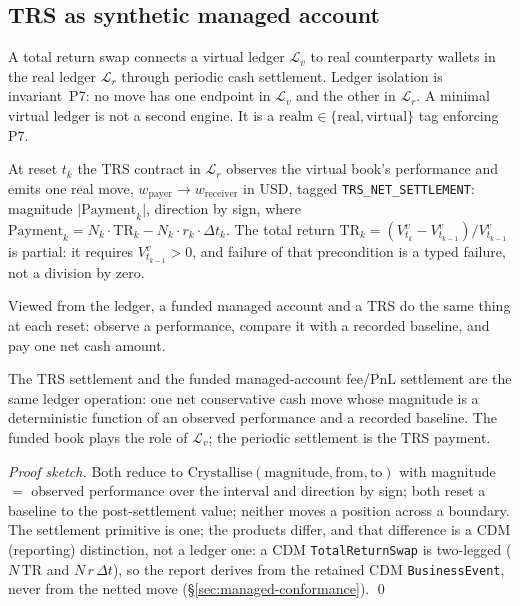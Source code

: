 \subsection{TRS as synthetic managed account}
\label{sec:managed-trs}

A total return swap connects a virtual ledger $\mathcal{L}_v$ to real counterparty wallets
in the real ledger $\mathcal{L}_r$ through periodic cash settlement. Ledger isolation is
invariant~P7: no move has one endpoint in $\mathcal{L}_v$ and the other in $\mathcal{L}_r$.
A minimal virtual ledger is not a second engine. It is a
$\mathrm{realm}\in\{\text{real},\text{virtual}\}$ tag enforcing P7.

At reset $t_k$ the TRS contract in $\mathcal{L}_r$ observes the virtual book's performance
and emits one real move, $w_{\text{payer}}\to w_{\text{receiver}}$ in USD, tagged
\texttt{TRS\_NET\_SETTLEMENT}: magnitude $\big|\mathrm{Payment}_k\big|$, direction by sign,
where $\mathrm{Payment}_k=N_k\cdot\mathrm{TR}_k-N_k\cdot r_k\cdot\Delta t_k$. The
total return $\mathrm{TR}_k=(V^v_{t_k}-V^v_{t_{k-1}})/V^v_{t_{k-1}}$ is partial: it requires
$V^v_{t_{k-1}}>0$, and failure of that precondition is a typed failure, not a division by
zero.

Viewed from the ledger, a funded managed account and a TRS do the same thing at each reset:
observe a performance, compare it with a recorded baseline, and pay one net cash amount.

\begin{theorem}
\label{thm:trs-equiv}
The TRS settlement and the funded managed-account fee/PnL settlement are the same ledger
operation: one net conservative cash move whose magnitude is a deterministic function of an
observed performance and a recorded baseline. The funded book plays the role of $\mathcal{L}_v$;
the periodic settlement is the TRS payment.
\end{theorem}
\noindent\textit{Proof sketch.} Both reduce to
$\mathrm{Crystallise}(\text{magnitude},\text{from},\text{to})$ with magnitude $=$ observed
performance over the interval and direction by sign; both reset a baseline to the post-settlement
value; neither moves a position across a boundary. The settlement primitive is one; the products
differ, and that difference is a CDM (reporting) distinction, not a ledger one: a CDM
\texttt{TotalReturnSwap} is two-legged ($N\,\mathrm{TR}$ and $N\,r\,\Delta t$), so the report
derives from the retained CDM \texttt{BusinessEvent}, never from the netted move
(\S\ref{sec:managed-conformance}). \qed

